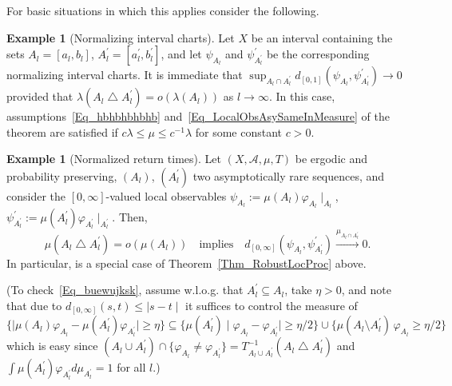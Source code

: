 \documentclass[10pt]{amsart}
\theoremstyle{definition}\newtheorem{defi}[theo]{Definition}\newtheorem{rema}[theo]{Remark}\newtheorem{exam}[theo]{Example}\newtheorem{exem}[theo]{Example}\newtheorem{nota}[theo]{Notation}
\newcommand{\clA}{\mathcal{A}}
\begin{document}
For basic situations in which this applies consider the following.

\begin{exam}[{Normalizing interval charts}]
Let $X$ be an interval containing the sets $A_{l}=[a_{l},b_{l}]$, $A_{l}^{\prime}=[a_{l}^{\prime},b_{l}^{\prime}]$, and let $\psi_{A_{l}}$ and $\psi_{A_{l}^{\prime}}^{\prime}$ be the corresponding normalizing interval charts. It is immediate that $\sup _{A_{l}\cap A_{l}^{\prime}}d_{[0,1]}(\psi_{A_{l}},\psi_{A_{l}^{\prime} }^{\prime})\rightarrow0$ provided that $\lambda(A_{l}\bigtriangleup A_{l}^{\prime})=o(\lambda(A_{l}))$ as $l\rightarrow\infty$. In this case, assumptions~\eqref{Eq_hbhbhbhbhb} and~\eqref{Eq_LocalObsAsySameInMeasure} of the theorem are satisfied if $c\lambda\leq\mu\leq c^{-1}\lambda$ for some constant $c>0$.
\end{exam}

\begin{exam}[{Normalized return times}]\label{Ex_RobustRetTimes}
Let $(X,\clA,\mu,T)$ be ergodic and probability preserving, $(A_{l})$, $(A_{l}^{\prime})$ two asymptotically rare sequences, and consider the $[0,\infty]$-valued local observables $\psi_{A_{l}}:=\mu(A_{l})\varphi_{A_{l}}\mid_{A_{l}}$, $\psi_{A_{l}^{\prime}}^{\prime}:=\mu(A_{l}^{\prime})\varphi_{A_{l}^{\prime} }\mid_{A_{l}^{\prime}}$. Then,
\begin{equation}\label{Eq_buewujksk}
\mu\left(A_{l}\bigtriangleup A_{l}^{\prime}\right)=o\left(\mu(A_{l})\right)\quad\text{implies}\quad d_{[0,\infty]}\left(\psi_{A_{l}},\psi_{A_{l}^{\prime}}^{\prime}\right)\overset{\mu_{A_{l}\cap A_{l}^{\prime}}}{\longrightarrow}0.
\end{equation}
In particular, \cite[Theorem~2.2]{Z11} is a special case of Theorem~\ref{Thm_RobustLocProc} above.

(To check~\eqref{Eq_buewujksk}, assume w.l.o.g. that $A_{l}^{\prime}\subseteq A_{l}$, take $\eta>0$, and note that due to $d_{[0,\infty]}(s,t)\leq\mid s-t\mid$ it suffices to control the measure of $\{\mid\mu(A_{l})\varphi _{A_{l}}-\mu(A_{l}^{\prime})\varphi_{A_{l}^{\prime}}\mid\geq\eta
\}\subseteq\{\mu(A_{l}^{\prime})\mid\varphi_{A_{l}}-\varphi_{A_{l}^{\prime} }\mid\geq\eta/2\}\cup\{\mu(A_{l}\setminus A_{l}^{\prime})\,\varphi_{A_{l}}
\geq\eta/2\}$ which is easy since $(A_{l}\cup A_{l}^{\prime})\cap
\{\varphi_{A_{l}}\neq\varphi_{A_{l}^{\prime}}\}=T_{A_{l}\cup A_{l}^{\prime} }^{-1}(A_{l}\bigtriangleup A_{l}^{\prime})$ and $\int\mu(A_{l}^{\prime })\varphi_{A_{l}^{\prime}}d\mu_{A_{l}^{\prime}}=1$ for all $l$.)
\end{exam}
\end{document}

